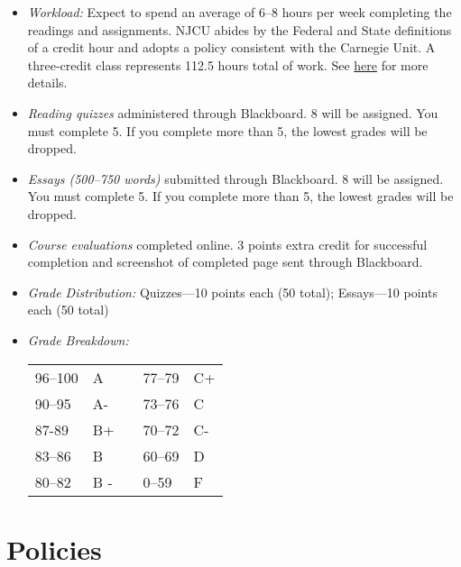 \documentclass[article,oneside]{memoir}
\begin{document}
\begin{itemize}
\item \textit{Workload:} Expect to spend an average of 6--8 hours per week  completing the readings and assignments. NJCU abides by the Federal and State definitions of a credit hour and adopts a policy consistent with the Carnegie Unit. A three-credit class represents 112.5 hours total of work. See \href{http://scoconno.github.io/Teaching/Credit.pdf}{here} for more details.

\item \textit{Reading quizzes} administered through Blackboard. 8 will be assigned. You must complete 5. If you complete more than 5, the lowest grades will be dropped. 


\item \textit{Essays (500--750 words)} submitted through Blackboard.  8 will be assigned. You must complete 5. If you complete more than 5, the lowest grades will be dropped. 

\item \textit{Course evaluations} completed online. 3 points extra credit for successful completion and screenshot of completed page sent through Blackboard. 
 
\item \textit{Grade Distribution:} Quizzes---10 points each (50 total);  Essays---10 points each (50 total)


 



\item \textit{Grade Breakdown:}

 \begin{tabular}{ | l | l | p{2cm} | l | l | }
    \hline 
96--100 & A  & &  77--79 &  C+ \\  
90--95 & A- & &  73--76 & C \\
87-89 & B+ &  &  70--72 & C- \\ 
83--86 & B  & &  60--69 & D\\
80--82 & B - & & 0--59 & F\\ \hline
    \end{tabular}


\end{itemize}


\section{Policies}
\end{document}
